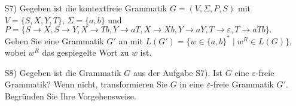 
\begin{exercise}

\begin{enumerate}
\item[S7)] Gegeben ist die kontextfreie Grammatik $G=(V,\Sigma,P, S)$ mit $V = \{S,X,Y,T\}$,
    $\Sigma=\{a,b\}$ und
    $P=\{S\rightarrow X, S\rightarrow Y, X\rightarrow Tb, Y\rightarrow aT,
    X\rightarrow Xb, Y\rightarrow aY, T\rightarrow \varepsilon, T\rightarrow aTb\}.$
    Geben Sie eine Grammatik $G'$ an mit $L(G')=\{w\in\{a,b\}^*\mid w^R\in L(G)\}$, wobei $w^R$ das gespiegelte Wort zu $w$ ist.  
\item[S8)] Gegeben ist die Grammatik $G$ aus der Aufgabe S7). Ist $G$ eine $\varepsilon$-freie Grammatik? Wenn nicht, transformieren Sie $G$ in eine $\varepsilon$-freie Grammatik $G'$. Begr\"unden Sie Ihre Vorgehensweise.
\end{enumerate}

\end{exercise}

